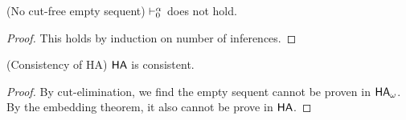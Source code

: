 \begin{cththeorem}{(No cut-free empty sequent)}
    $\vdash^{\alpha}_{0}$ does not hold.
\end{cththeorem}
\begin{proof}
    This holds by induction on number of inferences.
\end{proof}

\begin{cththeorem}{(Consistency of HA)}
    $\textsf{HA}$ is consistent.
\end{cththeorem}
\begin{proof}
  By cut-elimination, we find the empty sequent cannot be proven in $\textsf{HA}_\omega$. By the embedding theorem, it also cannot be prove in $\textsf{HA}$.
\end{proof}

